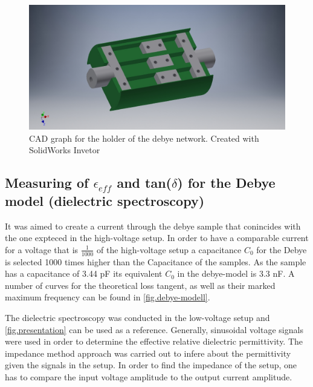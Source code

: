 \begin{figure}[h!tb]
\includegraphics[width=\textwidth]{figures/Method/CAD_MODEL/Gesamtanordnung.jpg}
\caption{CAD graph for the holder of the debye network. Created with SolidWorks Invetor}
\label{fig.CADgraph}
\end{figure}




    

\subsection{Measuring of $\epsilon_{eff}$ and tan($\delta$) for the Debye model (dielectric spectroscopy)}
\label{spectroscopy}
It was aimed to create a current through the debye sample that conincides with the one expteced in the high-voltage setup. In order to have a comparable current for a voltage that is $\frac{1}{1000}$ of the high-voltage setup a capacitance $C_0$ for the Debye is selected 1000 times higher than the Capacitance of the samples. As the sample has a capacitance of 3.44 pF its equivalent $C_0$ in the debye-model is 3.3 nF.
A number of curves for the theoretical loss tangent, as well as their marked maximum frequency can be found in \ref{fig.debye-modell}.

The dielectric spectroscopy was conducted in the low-voltage setup and \ref{fig.presentation} can be used as a reference.
Generally, sinusoidal voltage signals were used in order to determine the effective relative dielectric permittivity.
The impedance method \cite{Kramer} approach was carried out to infere about the permittivity given the signals in the setup.
In order to find the impedance of the setup, one has to compare the input voltage amplitude to the output current amplitude.

